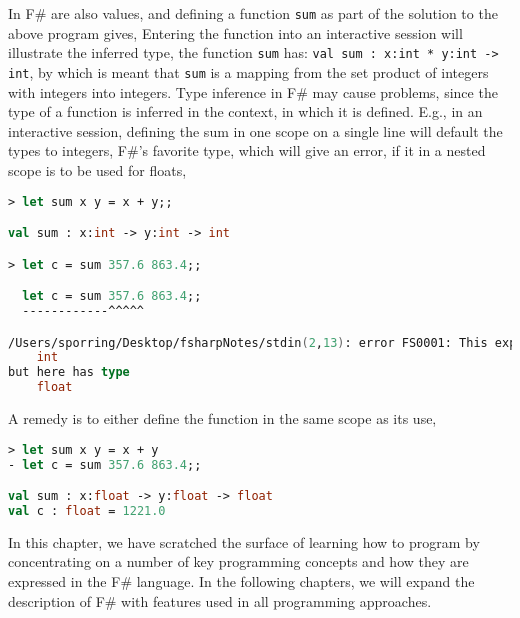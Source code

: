 In F\#  are also values, and defining a function \lstinline|sum| as part of the solution to the above program gives,
%
%
Entering the function into an interactive session will illustrate the inferred type, the function \lstinline|sum| has: \lstinline{val sum : x:int * y:int -> int}, by which is meant that \lstinline|sum| is a mapping from the set product of integers with integers into integers. Type inference in F\# may cause problems, since the type of a function is inferred in the context, in which it is defined. E.g., in an interactive session, defining the sum in one scope on a single line will default the types to integers, F\#'s favorite type, which will give an error, if it in a nested scope is to be used for floats,
\begin{lstlisting}[language=fsharp,caption=fsharpi]
> let sum x y = x + y;;

val sum : x:int -> y:int -> int

> let c = sum 357.6 863.4;;

  let c = sum 357.6 863.4;;
  ------------^^^^^

/Users/sporring/Desktop/fsharpNotes/stdin(2,13): error FS0001: This expression was expected to have type
    int    
but here has type
    float    
\end{lstlisting}
A remedy is to either define the function in the same scope as its use,
\begin{lstlisting}[language=fsharp,caption=fsharpi]
> let sum x y = x + y
- let c = sum 357.6 863.4;;

val sum : x:float -> y:float -> float
val c : float = 1221.0
\end{lstlisting}

In this chapter, we have scratched the surface of learning how to program by concentrating on a number of key programming concepts and how they are expressed in the F\# language. In the following chapters, we will expand the description of F\# with features used in all programming approaches.

